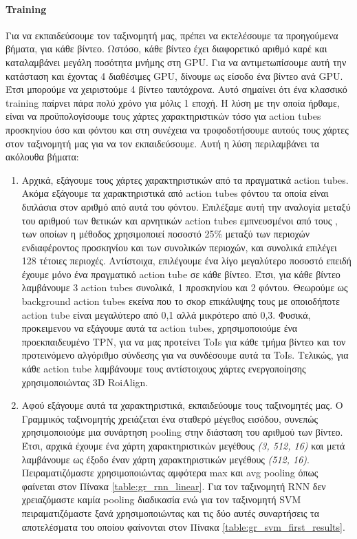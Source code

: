 \paragraph{\en Training\gr}
\gr Για να εκπαιδεύσουμε τον ταξινομητή μας, πρέπει να εκτελέσουμε τα προηγούμενα βήματα,
για κάθε βίντεο. Ωστόσο, κάθε βίντεο έχει διαφορετικό αριθμό καρέ και καταλαμβάνει 
μεγάλη ποσότητα μνήμης στη \en GPU\gr. Για να αντιμετωπίσουμε αυτή την κατάσταση και έχοντας 4 διαθέσιμες \en GPU\gr, δίνουμε
ως είσοδο ένα βίντεο ανά \en GPU\gr. Έτσι μπορούμε να χειριστούμε 4 βίντεο ταυτόχρονα. Αυτό
σημαίνει ότι ένα κλασσικό \en training \gr παίρνει πάρα πολύ χρόνο για μόλις 1 εποχή.
Η λύση με την οποία ήρθαμε, είναι να προϋπολογίσουμε τους χάρτες χαρακτηριστικών τόσο για \en action tubes \gr
προσκηνίου όσο και φόντου και στη συνέχεια να τροφοδοτήσουμε
αυτούς τους χάρτες στον ταξινομητή μας για να τον εκπαιδεύσουμε. 
Αυτή η λύση περιλαμβάνει τα ακόλουθα βήματα:
\begin{enumerate}
\item Αρχικά, εξάγουμε τους χάρτες χαρακτηριστικών από τα πραγματικά \en action tubes\gr. Ακόμα εξάγουμε τα χαρακτηριστικά από \en
  action tubes \gr φόντου τα οποία είναι διπλάσια στον αριθμό από αυτά του φόντου. Επιλέξαμε αυτή την αναλογία μεταξύ του αριθμού των
  θετικών και αρνητικών \en action tubes \gr εμπνευσμένοι από τους \en\cite{jjfaster2rcnn}\gr, των οποίων η μέθοδος χρησιμοποιεί ποσοστό
  25\% μεταξύ των περιοχών ενδιαφέροντος προσκηνίου και των συνολικών περιοχών, και συνολικά επιλέγει 128 τέτοιες περιοχές. Αντίστοιχα,
  επιλέγουμε ένα λίγο μεγαλύτερο ποσοστό επειδή έχουμε μόνο ένα πραγματικό \en action tube \gr σε κάθε βίντεο. Έτσι, για κάθε βίντεο
  λαμβάνουμε 3 \en action tubes \gr συνολικά, 1 προσκηνίου και 2 φόντου. Θεωρούμε ως \en background action tubes \gr εκείνα που το σκορ
  επικάλυψης τους με οποιοδήποτε \en action tube \gr είναι μεγαλύτερο από 0,1 αλλά μικρότερο από 0,3. Φυσικά, προκειμενου να εξάγουμε αυτά
  τα \en action tubes\gr, χρησιμοποιούμε ένα  προεκπαιδευμένο \en TPN, \gr για να μας προτείνει \en ToIs \gr για κάθε τμήμα βίντεο και
  τον προτεινόμενο αλγόριθμο σύνδεσης για να συνδέσουμε αυτά τα \en ToIs\gr. Τελικώς, για κάθε \en action tube \gr λαμβάνουμε
  τους αντίστοιχους χάρτες ενεργοποίησης χρησιμοποιώντας \en 3D RoiAlign. \gr
\item Αφού εξάγουμε αυτά τα χαρακτηριστικά, εκπαιδεύουμε τους ταξινομητές μας. Ο Γραμμικός ταξινομητής χρειάζεται ένα σταθερό μέγεθος
  εισόδου, συνεπώς χρησιμοποιούμε μια συνάρτηση \en pooling \gr στην διάσταση του αριθμού των βίντεο. Έτσι, αρχικά έχουμε ένα
  χάρτη χαρακτηριστικών μεγέθους \textit{(3, 512, 16)} και μετά λαμβάνουμε ως έξοδο έναν χάρτη χαρακτηριστικών μεγέθους \textit{(512, 16)}.
  Πειραματιζόμαστε χρησιμοποιώντας αμφότερα \en max \gr και \en avg pooling \gr όπως φαίνεται στον Πίνακα  \ref{table:gr_rnn_linear}. Για τον ταξινομητή \en RNN \gr δεν χρειαζόμαστε καμία \en pooling \gr διαδικασία ενώ για τον ταξινομητή \en SVM \gr
  πειραματιζόμαστε ξανά χρησιμοποιώντας   και τις δύο αυτές συναρτήσεις τα αποτελέσματα του οποίου φαίνονται στον Πίνακα \ref{table:gr_svm_first_results}.
\end{enumerate}
